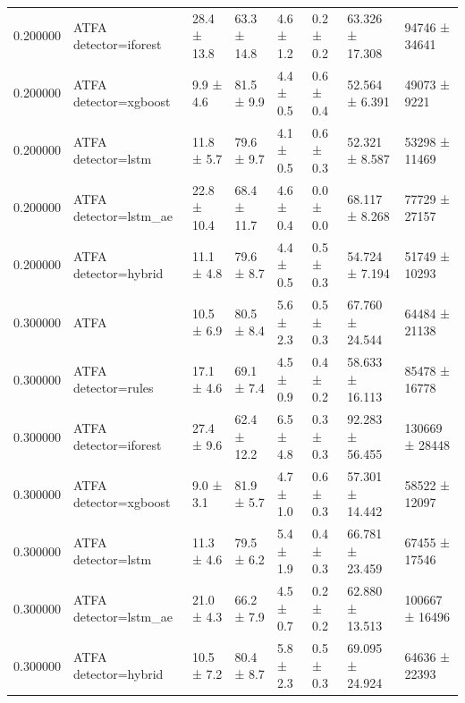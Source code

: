 \begin{tabular}{rlllllll}
0.200000 & ATFA detector=iforest & 28.4 ± 13.8 & 63.3 ± 14.8 & 4.6 ± 1.2 & 0.2 ± 0.2 & 63.326 ± 17.308 & 94746 ± 34641 \\
0.200000 & ATFA detector=xgboost & 9.9 ± 4.6 & 81.5 ± 9.9 & 4.4 ± 0.5 & 0.6 ± 0.4 & 52.564 ± 6.391 & 49073 ± 9221 \\
0.200000 & ATFA detector=lstm & 11.8 ± 5.7 & 79.6 ± 9.7 & 4.1 ± 0.5 & 0.6 ± 0.3 & 52.321 ± 8.587 & 53298 ± 11469 \\
0.200000 & ATFA detector=lstm\_ae & 22.8 ± 10.4 & 68.4 ± 11.7 & 4.6 ± 0.4 & 0.0 ± 0.0 & 68.117 ± 8.268 & 77729 ± 27157 \\
0.200000 & ATFA detector=hybrid & 11.1 ± 4.8 & 79.6 ± 8.7 & 4.4 ± 0.5 & 0.5 ± 0.3 & 54.724 ± 7.194 & 51749 ± 10293 \\
0.300000 & ATFA & 10.5 ± 6.9 & 80.5 ± 8.4 & 5.6 ± 2.3 & 0.5 ± 0.3 & 67.760 ± 24.544 & 64484 ± 21138 \\
0.300000 & ATFA detector=rules & 17.1 ± 4.6 & 69.1 ± 7.4 & 4.5 ± 0.9 & 0.4 ± 0.2 & 58.633 ± 16.113 & 85478 ± 16778 \\
0.300000 & ATFA detector=iforest & 27.4 ± 9.6 & 62.4 ± 12.2 & 6.5 ± 4.8 & 0.3 ± 0.3 & 92.283 ± 56.455 & 130669 ± 28448 \\
0.300000 & ATFA detector=xgboost & 9.0 ± 3.1 & 81.9 ± 5.7 & 4.7 ± 1.0 & 0.6 ± 0.3 & 57.301 ± 14.442 & 58522 ± 12097 \\
0.300000 & ATFA detector=lstm & 11.3 ± 4.6 & 79.5 ± 6.2 & 5.4 ± 1.9 & 0.4 ± 0.3 & 66.781 ± 23.459 & 67455 ± 17546 \\
0.300000 & ATFA detector=lstm\_ae & 21.0 ± 4.3 & 66.2 ± 7.9 & 4.5 ± 0.7 & 0.2 ± 0.2 & 62.880 ± 13.513 & 100667 ± 16496 \\
0.300000 & ATFA detector=hybrid & 10.5 ± 7.2 & 80.4 ± 8.7 & 5.8 ± 2.3 & 0.5 ± 0.3 & 69.095 ± 24.924 & 64636 ± 22393 \\
\bottomrule
\end{tabular}
